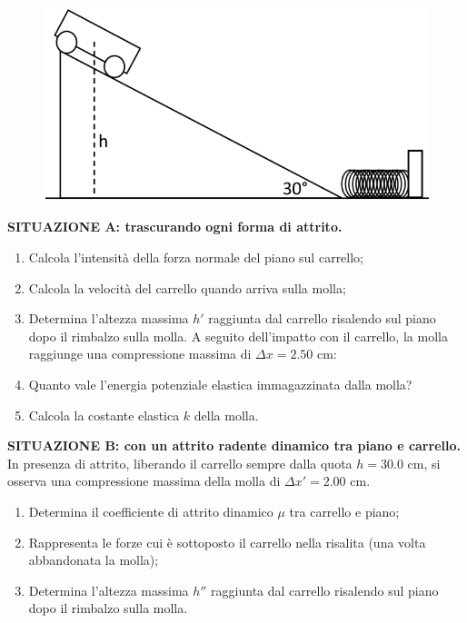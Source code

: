 \documentclass{article}
\begin{document}
\begin{figure}[h]
    \centering
    \includegraphics[width=.8\textwidth]{Esercizio 4.png}
    \vspace{0.4cm}
\end{figure}

\textbf{SITUAZIONE A: trascurando ogni forma di attrito.}
\begin{enumerate}[label=\textbf{\alph*)}]
    \item Calcola l'intensità della forza normale del piano sul carrello;
    \item Calcola la velocità del carrello quando arriva sulla molla;
    \item Determina l'altezza massima $h'$ raggiunta dal carrello
    risalendo sul piano dopo il rimbalzo sulla molla.
        \linebreak
        \linebreak
        A seguito dell'impatto con il carrello, la molla raggiunge una
        compressione massima di $\Delta{x} = 2.50$ cm:
    \item Quanto vale l'energia potenziale elastica immagazzinata
        dalla molla?
    \item Calcola la costante elastica $k$ della molla.
\end{enumerate}
\vspace{2.5mm}
\textbf{SITUAZIONE B: con un attrito radente dinamico tra piano e carrello.}
    \\ In presenza di attrito, liberando il carrello sempre dalla quota
    $h = 30.0$ cm, si osserva una compressione massima della molla di
    $\Delta{x'} = 2.00$ cm.
\begin{enumerate}[label=\textbf{\alph*)}]
    \item Determina il coefficiente di attrito dinamico $\mu$ tra
        carrello e piano;
    \item Rappresenta le forze cui è sottoposto il carrello nella risalita
        (una volta abbandonata la molla);
    \item Determina l'altezza massima $h''$ raggiunta dal carrello
        risalendo sul piano dopo il rimbalzo sulla molla.
\end{enumerate}
\end{document}
